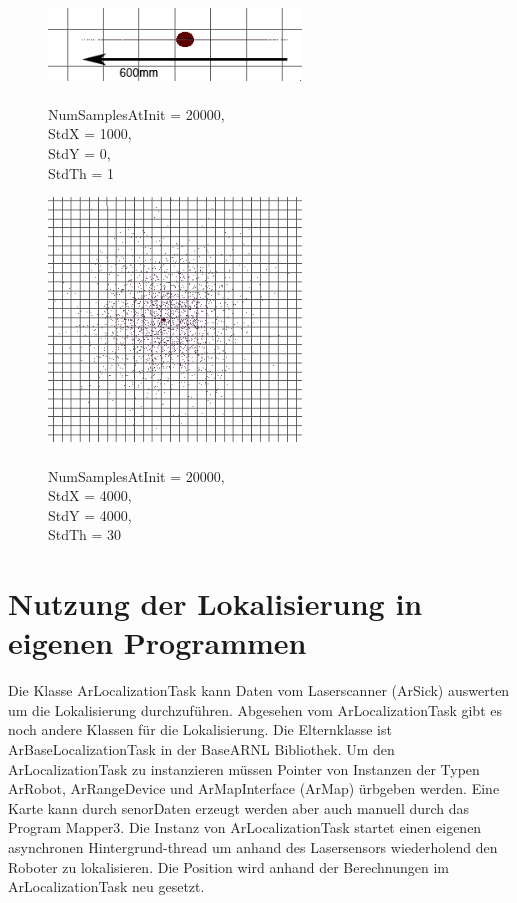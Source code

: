 \documentclass{article}
\begin{document}
\begin{figure}
	\centering
	\includegraphics[width=0.6\textwidth]{img/stdx1000stdy0stdth1.png}
	\caption{\\ NumSamplesAtInit = 20000, \\ StdX = 1000,\\ StdY = 0,\\ StdTh = 1}
	\label{stdx1000stdy0stdth1Test}
\end{figure}

\begin{figure}
	\centering
	\includegraphics[width=0.6\textwidth]{img/stdx4000stdy4000stdth30.png}
	\caption{\\ NumSamplesAtInit = 20000, \\ StdX = 4000,\\ StdY = 4000,\\ StdTh = 30}
	\label{stdx4000stdy4000stdth30}
\end{figure}

\newpage
\newpage
\section{Nutzung der Lokalisierung in eigenen Programmen}\label{eigenes}
 Die Klasse ArLocalizationTask kann Daten vom Laserscanner (ArSick) auswerten um die Lokalisierung durchzuf\"uhren. Abgesehen vom ArLocalizationTask gibt es noch andere Klassen f\"ur die Lokalisierung. Die Elternklasse ist ArBaseLocalizationTask in der BaseARNL Bibliothek. \cite{arnl}
Um den ArLocalizationTask zu instanzieren m\"ussen Pointer von Instanzen der Typen ArRobot, ArRangeDevice und ArMapInterface (ArMap) \"urbgeben werden. Eine Karte kann durch senorDaten erzeugt werden aber auch manuell durch das Program Mapper3. Die Instanz von ArLocalizationTask startet einen eigenen asynchronen Hintergrund-thread um anhand des Lasersensors wiederholend den Roboter zu lokalisieren. Die Position wird anhand der Berechnungen im ArLocalizationTask neu gesetzt.
\end{document}
